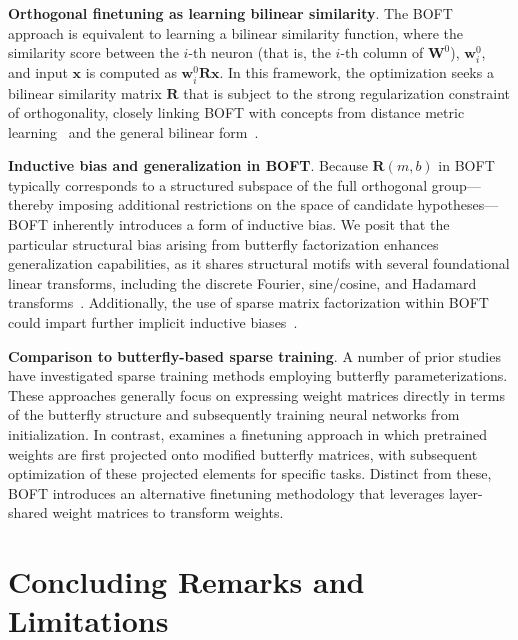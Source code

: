 \textbf{Orthogonal finetuning as learning bilinear similarity}. The BOFT approach is equivalent to learning a bilinear similarity function, where the similarity score between the $i$-th neuron (that is, the $i$-th column of $\bm{W}^0$), $\bm{w}^0_i$, and input $\bm{x}$ is computed as $\bm{w}^0_i\bm{R}\bm{x}$. In this framework, the optimization seeks a bilinear similarity matrix $\bm{R}$ that is subject to the strong regularization constraint of orthogonality, closely linking BOFT with concepts from distance metric learning~\cite{xing2002distance} and the general bilinear form~\cite{roman2005advanced}.

\textbf{Inductive bias and generalization in BOFT}. Because $\bm{R}(m,b)$ in BOFT typically corresponds to a structured subspace of the full orthogonal group—thereby imposing additional restrictions on the space of candidate hypotheses—BOFT inherently introduces a form of inductive bias. We posit that the particular structural bias arising from butterfly factorization enhances generalization capabilities, as it shares structural motifs with several foundational linear transforms, including the discrete Fourier, sine/cosine, and Hadamard transforms~\cite{dao2019kaleidoscope}. Additionally, the use of sparse matrix factorization within BOFT could impart further implicit inductive biases~\cite{gunasekar2017implicit,li2018algorithmic,liu2019neural}.

\textbf{Comparison to butterfly-based sparse training}. A number of prior studies~\cite{dao2019learning,dao2019kaleidoscope,chen2022pixelated,dao2022monarch} have investigated sparse training methods employing butterfly parameterizations. These approaches generally focus on expressing weight matrices directly in terms of the butterfly structure and subsequently training neural networks from initialization. In contrast, \cite{dao2022monarch} examines a finetuning approach in which pretrained weights are first projected onto modified butterfly matrices, with subsequent optimization of these projected elements for specific tasks. Distinct from these, BOFT introduces an alternative finetuning methodology that leverages layer-shared weight matrices to transform weights.



\section{Concluding Remarks and Limitations}

